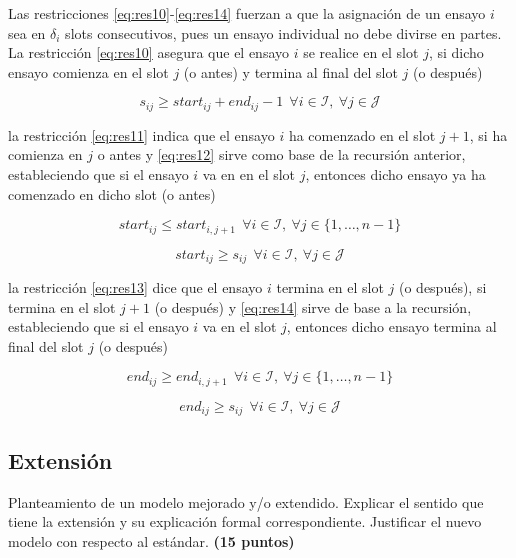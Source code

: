 \documentclass[journal, 10pt]{IEEEtran}
\begin{document}
\begin{itemize}
Las restricciones \eqref{eq:res10}-\eqref{eq:res14} fuerzan a que la asignación de un ensayo $i$ sea en $\delta_i$ slots consecutivos, pues un ensayo individual no debe divirse en partes. La restricción \eqref{eq:res10} asegura que el ensayo $i$ se realice en el slot $j$, si dicho ensayo comienza en el slot $j$ (o antes) y termina al final del slot $j$ (o después)	 

\begin{equation}\label{eq:res10} 
	s_{ij} \geq start_{ij} + end_{ij} -1 \ \ \forall i \in \mathcal{I}, \ \forall j \in \mathcal{J}
\end{equation}

la restricción \eqref{eq:res11} indica que el ensayo $i$ ha comenzado en el slot $j+1$, si ha comienza en $j$ o antes y \eqref{eq:res12} sirve como base de la recursión anterior, estableciendo que si el ensayo $i$ va en en el slot $j$, entonces dicho ensayo ya ha comenzado en dicho slot (o antes)

\begin{equation}\label{eq:res11} 
	start_{ij} \leq start_{i,j+1} \ \ \forall i \in \mathcal{I}, \ \forall j \in \{1,\ldots,n-1\}
\end{equation}  

\begin{equation}\label{eq:res12} 
	start_{ij} \geq s_{ij} \ \ \forall i \in \mathcal{I}, \ \forall j \in \mathcal{J}
\end{equation}

la restricción \eqref{eq:res13} dice que el ensayo $i$ termina en el slot $j$ (o después), si termina en el slot $j+1$ (o después) y \eqref{eq:res14} sirve de base a la recursión, estableciendo que si el ensayo $i$ va en el slot $j$, entonces dicho ensayo termina al final del slot $j$ (o después)  

\begin{equation}\label{eq:res13} 
	end_{ij} \geq end_{i,j+1} \ \ \forall i \in \mathcal{I}, \ \forall j \in \{1,\ldots,n-1\}
\end{equation} 

\begin{equation}\label{eq:res14} 
	end_{ij} \geq s_{ij} \ \ \forall i \in \mathcal{I}, \ \forall j \in \mathcal{J}
\end{equation}	

\end{itemize}  



\subsection{Extensión}
Planteamiento de un modelo mejorado y/o extendido. Explicar el sentido que tiene la extensión y su explicación formal correspondiente. Justificar el nuevo modelo con respecto al estándar. \textbf{(15 puntos)}
\end{document}
